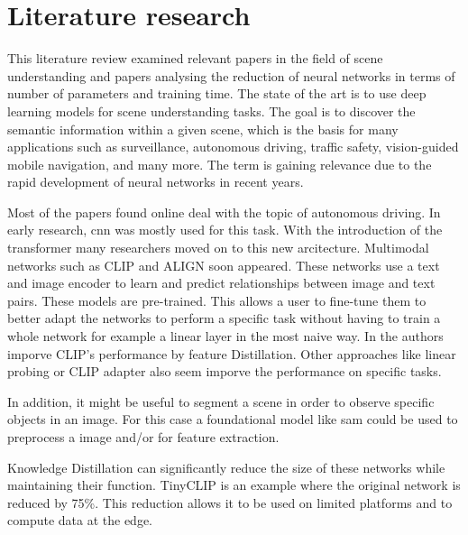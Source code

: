 \chapter{Literature research}

This literature review examined relevant papers in the field of scene understanding and papers analysing the reduction of neural networks in terms of number of parameters and training time.
The state of the art is to use deep learning models for scene understanding tasks.
The goal is to discover the semantic information within a given scene, which is the basis for many applications such as surveillance, autonomous driving, traffic safety, vision-guided mobile navigation, and many more.
The term is gaining relevance due to the rapid development of neural networks in recent years.

Most of the papers found online deal with the topic of autonomous driving\cite{sceneunderstandingautdriving1}.
In early research, \acrfull{cnn}\cite{SegNet} was mostly used for this task.
With the introduction of the transformer \cite{attentionisallyouneed} many researchers moved on to this new arcitecture.
Multimodal networks such as CLIP\cite{clip} and ALIGN\cite{ALIGN} soon appeared.
These networks use a text and image encoder to learn and predict relationships between image and text pairs.
These models are pre-trained.
This allows a user to fine-tune them to better adapt the networks to perform a specific task without having to train a whole network for example a linear layer in the most naive way.
In \cite{finetuneclip} the authors imporve CLIP's performance by feature Distillation.
Other approaches like linear probing\cite{linearprobeclip} or CLIP adapter\cite{clipadapter} also seem imporve the performance on specific tasks.

In addition, it might be useful to segment a scene in order to observe specific objects in an image.
For this case a foundational model like \Acrfull{sam}\cite{sam} could be used to preprocess a image and/or for feature extraction.

Knowledge Distillation can significantly reduce the size of these networks while maintaining their function.
TinyCLIP\cite{tinyclip} is an example where the original network is reduced by 75\%.
This reduction allows it to be used on limited platforms and to compute data at the edge.

